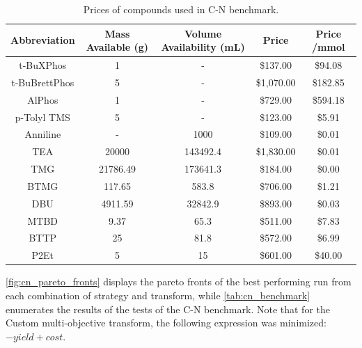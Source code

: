 \begin{table}
\caption{Prices of compounds used in C-N benchmark.}
\begin{tabular}{ccccc}
\textbf{Abbreviation} & \textbf{Mass Available (g)} & \textbf{Volume Availability (mL)} & \textbf{Price} & \textbf{Price /mmol} \\
\hline
t-BuXPhos     & 1        & -        & \$137.00   & \$94.08  \\
t-BuBrettPhos & 5        & -        & \$1,070.00 & \$182.85 \\
AlPhos        & 1        & -        & \$729.00   & \$594.18 \\
p-Tolyl TMS   & 5        & -        & \$123.00   & \$5.91   \\
Anniline      & -        & 1000     & \$109.00   & \$0.01   \\
TEA           & 20000    & 143492.4 & \$1,830.00 & \$0.01   \\
TMG           & 21786.49 & 173641.3 & \$184.00   & \$0.00   \\
BTMG          & 117.65   & 583.8    & \$706.00   & \$1.21   \\
DBU           & 4911.59  & 32842.9  & \$893.00   & \$0.03   \\
MTBD          & 9.37     & 65.3     & \$511.00   & \$7.83   \\
BTTP          & 25       & 81.8     & \$572.00   & \$6.99   \\
P2Et          & 5        & 15       & \$601.00   & \$40.00 
\end{tabular}

\label{tab:cn_benchmark_prices_2}
\end{table}

\ref{fig:cn_pareto_fronts} displays the pareto fronts of the best performing run from each combination of strategy and transform, while \ref{tab:cn_benchmark} enumerates the results of the tests of the C-N benchmark. Note that for the Custom multi-objective transform, the following expression was minimized: $-yield+cost$.

